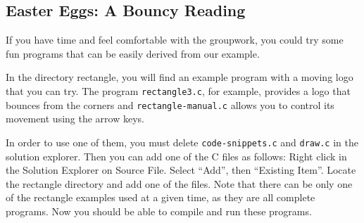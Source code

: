 \subsection{Easter Eggs: A Bouncy Reading}

If you have time and feel comfortable with the groupwork, you could try some fun programs that can be easily derived from our example.

In the directory rectangle, you will find an example program with a moving logo that you can try.
The program \texttt{rectangle3.c}, for example, provides a logo that bounces from the corners and \texttt{rectangle-manual.c} allows you to control its movement using the arrow keys.

In order to use one of them, you must delete \texttt{code-snippets.c} and \texttt{draw.c} in the solution explorer.
Then you can add one of the C files as follows: Right click in the Solution Explorer on Source File. Select “Add”, then “Existing Item”.
Locate the rectangle directory and add one of the files.
Note that there can be only one of the rectangle examples used at a given time, as they are all complete programs.
Now you should be able to compile and run these programs.


